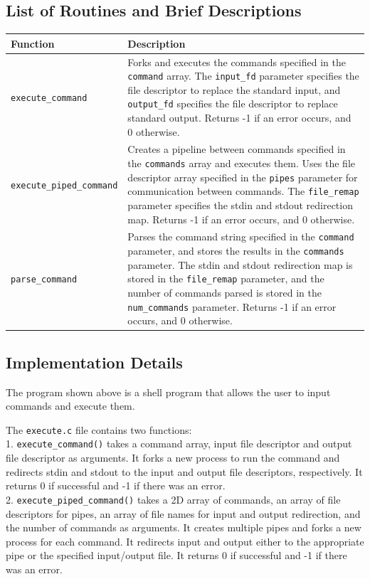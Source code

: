 \documentclass{article}
\begin{document}
\subsection{List of Routines and Brief Descriptions}
\begin{table}[h]
\centering
\begin{tabular}{|p{4cm}|p{9cm}|}
\hline
\textbf{Function} & \textbf{Description} \\ \hline
\texttt{execute\_command} & Forks and executes the commands specified in the \texttt{command} array. The \texttt{input\_fd} parameter specifies the file descriptor to replace the standard input, and \texttt{output\_fd} specifies the file descriptor to replace standard output. Returns -1 if an error occurs, and 0 otherwise. \\ \hline
\texttt{execute\_piped\_command} & Creates a pipeline between commands specified in the \texttt{commands} array and executes them. Uses the file descriptor array specified in the \texttt{pipes} parameter for communication between commands. The \texttt{file\_remap} parameter specifies the stdin and stdout redirection map. Returns -1 if an error occurs, and 0 otherwise. \\ \hline
\texttt{parse\_command} & Parses the command string specified in the \texttt{command} parameter, and stores the results in the \texttt{commands} parameter. The stdin and stdout redirection map is stored in the \texttt{file\_remap} parameter, and the number of commands parsed is stored in the \texttt{num\_commands} parameter. Returns -1 if an error occurs, and 0 otherwise. \\ \hline
\end{tabular}
\end{table}

\subsection{Implementation Details}
The program shown above is a shell program that allows the user to input commands and execute them.

The \texttt{execute.c} file contains two functions: \\
1. \texttt{execute\_command()} takes a command array, input file descriptor and output file descriptor as arguments. It forks a new process to run the command and redirects stdin and stdout to the input and output file descriptors, respectively. It returns 0 if successful and -1 if there was an error.  \\
2. \texttt{execute\_piped\_command()} takes a 2D array of commands, an array of file descriptors for pipes, an array of file names for input and output redirection, and the number of commands as arguments. It creates multiple pipes and forks a new process for each command. It redirects input and output either to the appropriate pipe or the specified input/output file. It returns 0 if successful and -1 if there was an error. 
\end{document}
